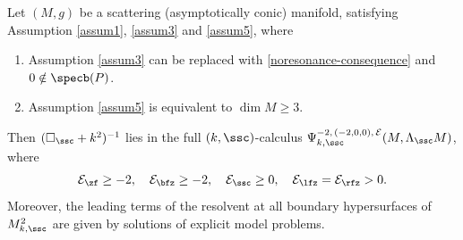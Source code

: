 \begin{Th} \label{initial ACM}
Let $(M,g)$ be a scattering (asymptotically conic) manifold, satisfying
Assumption \ref{assum1}, \ref{assum3} and \ref{assum5}, where
\begin{enumerate}
\item Assumption \ref{assum3} can be replaced with \eqref{noresonance-consequence} and
$0 \notin \specb(P)$.
\item Assumption \ref{assum5} is equivalent to $\dim M \geq 3$.
\end{enumerate}
Then $(\square_{\ssc} + k^{2})^{-1}$
lies in the full $(k,\ssc)$-calculus $\Psi_{k,\ssc}^{-2, \,(-2,0,0),\,\mathcal{E}}(M,\Lambda_\ssc M)$,
where
\[
\mathcal{E}_{\zf} \geq -2,
\quad \mathcal{E}_{\bfz} \geq -2, \quad \mathcal{E}_{\ssc} \geq 0, \quad\mathcal{E}_{\lfz} = \mathcal{E}_{\rfz} >0.
\]
Moreover, the leading terms of the resolvent at all boundary
hypersurfaces of $M^2_{k,\ssc}$ are given by solutions of explicit model problems.
\end{Th}

